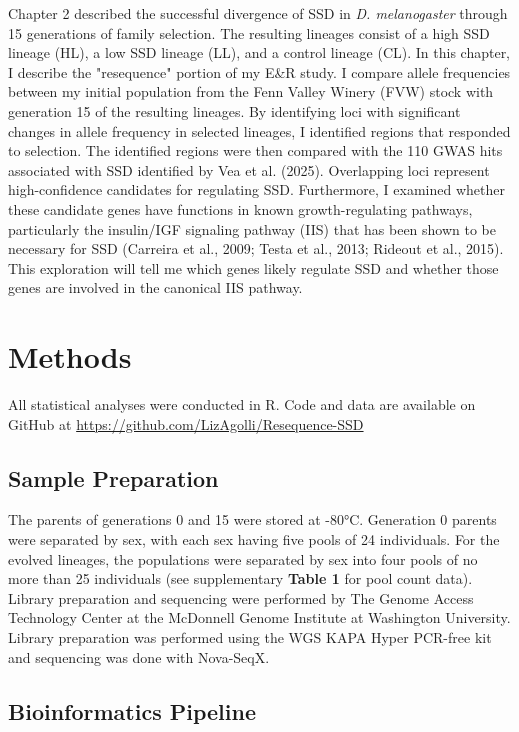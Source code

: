\documentclass[12pt,reqno,oneside]{report}
\begin{document}
Chapter 2 described the successful divergence of SSD in \textit{D. melanogaster} through 15 generations of family selection. The resulting lineages consist of a high SSD lineage (HL), a low SSD lineage (LL), and a control lineage (CL). In this chapter, I describe the "resequence" portion of my E\&R study. I compare allele frequencies between my initial population from the Fenn Valley Winery (FVW) stock with generation 15 of the resulting lineages. By identifying loci with significant changes in allele frequency in selected lineages, I identified regions that responded to selection. The identified regions were then compared with the 110 GWAS hits associated with SSD identified by Vea et al. (2025). Overlapping loci represent high-confidence candidates for regulating SSD. Furthermore, I examined whether these candidate genes have functions in known growth-regulating pathways, particularly the insulin/IGF signaling pathway (IIS) that has been shown to be necessary for SSD (Carreira et al., 2009; Testa et al., 2013; Rideout et al., 2015). This exploration will tell me which genes likely regulate SSD and whether those genes are involved in the canonical IIS pathway.

\section{Methods}
All statistical analyses were conducted in R. Code and data are available on GitHub at \url{https://github.com/LizAgolli/Resequence-SSD}

\subsection{Sample Preparation}

The parents of generations 0 and 15 were stored at -80°C. Generation 0 parents were separated by sex, with each sex having five pools of 24 individuals. For the evolved lineages, the populations were separated by sex into four pools of no more than 25 individuals (see supplementary \textbf{Table 1} for pool count data). Library preparation and sequencing were performed by The Genome Access Technology Center at the McDonnell Genome Institute at Washington University. Library preparation was performed using the WGS KAPA Hyper PCR-free kit and sequencing was done with Nova-SeqX.

\subsection{Bioinformatics Pipeline}
\end{document}
